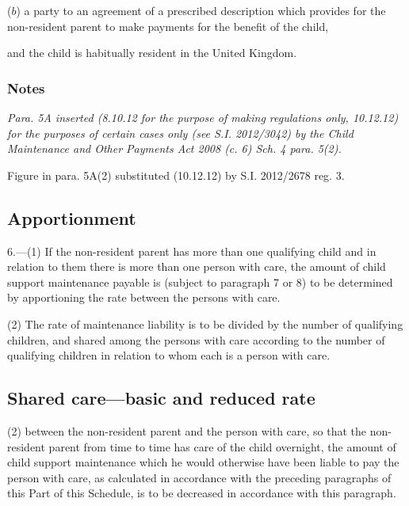 \documentclass[a4paper]{article}
\newcommand\amendment[1]{\subsubsection*{Notes}{\itshape\frenchspacing\footnotesize #1 \par}}
\begin{document}
{{\begin{enumerate}
($b$) a party to an agreement of a prescribed description which provides for the non-resident parent to make payments for the benefit of the child,
\end{enumerate}
and the child is habitually resident in the United Kingdom.

\amendment{
Para. 5A inserted (8.10.12 for the purpose of making regulations only, 10.12.12) for the purposes of certain cases only (see S.I. 2012/3042) by the Child Maintenance and Other Payments Act 2008 (c. 6) Sch. 4 para. 5(2).

Figure in para. 5A(2) substituted (10.12.12) by S.I. 2012/2678 reg. 3.
}

}

\subsection*{Apportionment}

6.---(1) If the non-resident parent has more than one qualifying child and in relation to them there is more than one person with care, the amount of child support maintenance payable is (subject to paragraph 7 or 8) to be determined by apportioning the rate between the persons with care.

(2) The rate of maintenance liability is to be divided by the number of qualifying children, and shared among the persons with care according to the number of qualifying children in relation to whom each is a person with care.

\subsection*{Shared care---basic and reduced rate}



(2)  between the non-resident parent and the person with care, so that the non-resident parent from time to time has care of the child overnight, the amount of child support maintenance which he would otherwise have been liable to pay the person with care, as calculated in accordance with the preceding paragraphs of this Part of this Schedule, is to be decreased in accordance with this paragraph.

}
\end{document}
